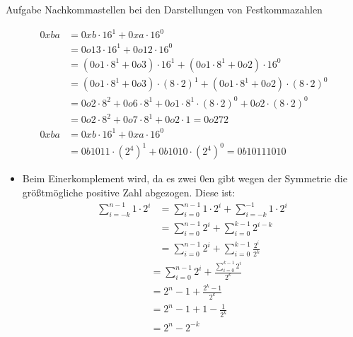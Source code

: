 \begin{frame}{Aufgabe \thesection}{Nachkommastellen bei den Darstellungen von Festkommazahlen\vspace{0.5cm}}
    \begin{Sidenote}
        \tiny
        \begin{align*}
            0xba &= 0xb \cdot 16^1 + 0xa \cdot 16^0\\
            &= 0o13 \cdot 16^1 + 0o12 \cdot 16^0\\
            &= (0o1 \cdot 8^1 + 0o3) \cdot 16^1 + (0o1 \cdot 8^1+  0o2) \cdot 16^0\\
            &= (0o1 \cdot 8^1 + 0o3) \cdot (8 \cdot 2)^1 + (0o1 \cdot 8^1+  0o2) \cdot (8 \cdot 2)^0\\
            &= 0o2 \cdot 8^2 + 0o6 \cdot 8^1 + 0o1 \cdot 8^1 \cdot (8 \cdot 2)^0 + 0o2 \cdot (8 \cdot 2)^0\\
            &= 0o2 \cdot 8^2 + 0o7 \cdot 8^1 + 0o2 \cdot 1 = 0o272 \\
            0xba &= 0xb \cdot 16^1 + 0xa \cdot 16^0\\
            &= 0b1011 \cdot (2^4)^1 + 0b1010 \cdot (2^4)^0 = 0b10111010 
        \end{align*}
    \end{Sidenote}

    \begin{Sidenote}
        \begin{itemize}
            \item Beim \alert{Einerkomplement} wird, da es zwei $0$en gibt wegen der Symmetrie die größtmögliche positive Zahl abgezogen. Diese ist: 
            \begin{align*}
            \sum_{i=-k}^{n-1}1\cdot2^{i} &= \sum_{i=0}^{n-1}1\cdot2^{i} + \sum_{i=-k}^{-1}1\cdot2^{i} \\
            &= \sum_{i=0}^{n-1}2^{i} + \sum_{i=0}^{k-1} 2^{i-k}\\
            &= \sum_{i=0}^{n-1}2^{i} + \sum_{i=0}^{k-1} \frac{2^{i}}{2^k}
            \end{align*}
            \begin{align*}
            &= \sum_{i=0}^{n-1}2^{i} +  \frac{\sum_{i=0}^{k-1} 2^{i}}{2^k} \\
            & = 2^n-1+\frac{2^k-1}{2^k}\\
            & = 2^n-1+1-\frac{1}{2^k}\\
            & = 2^n-2^{-k}
            \end{align*}
        \end{itemize}
    \end{Sidenote}
\end{frame}

